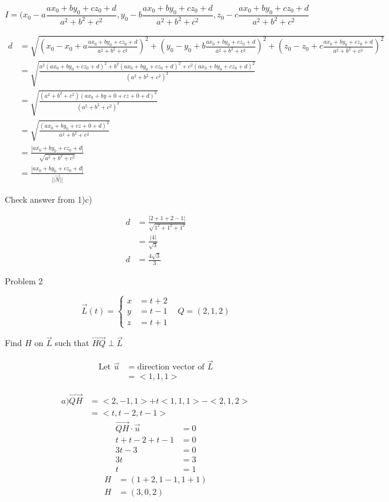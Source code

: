 \documentclass{article}
\begin{document}
$$
I = (x_0-a\frac{ax_0 + by_0 + cz_0 + d}{a^2 + b^2 + c^2}, y_0-b\frac{ax_0 + by_0 + cz_0 + d}{a^2 + b^2 + c^2}, z_0-c\frac{ax_0 + by_0 + cz_0 + d}{a^2 + b^2 + c^2}
$$

\begin{align*}
d &= \sqrt{(x_0 - x_0 + a\frac{ax_0 + by_0 + cz_0 + d}{a^2 + b^2 + c^2})^2 + (y_0 - y_0 + b\frac{ax_0 + by_0 + cz_0 + d}{a^2 + b^2 + c^2})^2 + (z_0 - z_0 + c\frac{ax_0 + by_0 + cz_0 + d}{a^2 + b^2 + c^2})^2} \\
&= \sqrt{\frac{a^2(ax_0+by_0+cz_0+d)^2 + b^2(ax_0+by_0+cz_0+d)^2 + c^2(ax_0+by_0+cz_0+d)^2}{(a^2 + b^2 + c^2)^2}} \\
&= \sqrt{\frac{(a^2 + b^2 + c^2)(ax_0+by+0+cz+0+d)^2}{(a^2 + b^2 + c^2)^2}} \\
&= \sqrt{\frac{(ax_0 + by_0 + cz+0 +d)^2}{a^2 + b^2 + c^2}} \\
&= \frac{|ax_0 + by_0 + cz_0 + d|}{\sqrt{a^2+b^2+c^2}} \\
&= \frac{|ax_0 + by_0 + cz_0 + d|}{||\vec{N}||}
\end{align*}

\begin{text}
\newline
Check answer from 1)c)
\end{text}

\begin{align*}
d &= \frac{| 2 + 1 + 2 - 1 |}{\sqrt{1^2 + 1^2 + 1^2}} \\
&= \frac{| 4 |}{\sqrt{3}} \\
d &= \frac{4\sqrt{3}}{3}
\end{align*}



\begin{text}
Problem 2
\end{text}

\[\vec{L}(t) = \left\{
  \begin{array}{lr}
    x &= t + 2 \\
    y &= t - 1 \\
    z &= t + 1
  \end{array}
\right.
\;\;\;
Q = (2,1,2)
\]

\begin{text}
Find $H$ on $\vec{L}$ such that $\vec{HQ} \perp \vec{L}$ \\
\end{text}

\begin{align*}
\text{Let } \vec{u} &= \text{direction vector of } \vec{L} \\
&= <1,1,1>
\end{align*}

\begin{align*}
a) \vec{QH} &= <2, -1, 1> + t<1,1,1> - <2,1,2> \\
&= <t, t-2, t-1>
\end{align*}
\begin{align*}
\vec{QH} \cdot \vec{u} &= 0 \\
t + t - 2 + t -1 &= 0 \\
3t - 3 &= 0 \\
3t &= 3 \\
t &= 1
\end{align*}
\begin{align*}
H &= (1+2, 1-1, 1+1) \\
H &= (3, 0, 2)
\end{align*}
\end{document}
